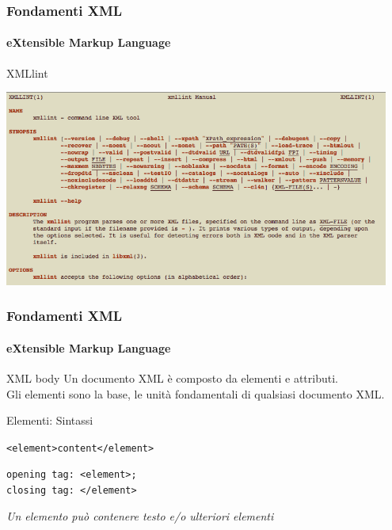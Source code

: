 \begin{frame}
	\frametitle{Fondamenti XML}
	\framesubtitle{eXtensible Markup Language}
	\addtocounter{nframe}{1}

	\begin{block}{XMLlint}
		\begin{center}
			\includegraphics[width=0.95\textwidth]{imgs/xml-XMLlint-man.png}
		\end{center}
	\end{block}

\end{frame}


\begin{frame}
    \frametitle{Fondamenti XML}
    \framesubtitle{eXtensible Markup Language}
    \addtocounter{nframe}{1}

	\begin{block}{XML body}
		Un documento XML è composto da elementi e attributi. 
	   \\ Gli elementi sono la base, le unità fondamentali di qualsiasi documento XML.
    \end{block}

    \begin{block}{Elementi: Sintassi}
    \begin{center}\texttt{<element>content</element>}\end{center}
    \begin{center}\texttt{opening tag: <element>;\\ closing tag: </element>}\end{center}
	\end{block}
	\begin{tiny}
		\textit{Un elemento può contenere testo e/o ulteriori elementi}
	\end{tiny}
	
\end{frame}


